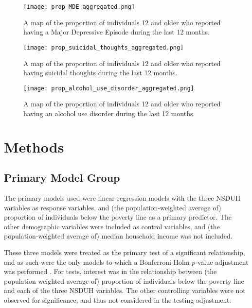 \documentclass{article}
\begin{document}
\begin{figure}[!htb]
    \centering
    \texttt{[image: prop\_MDE\_aggregated.png]}
    \caption{A map of the proportion of individuals 12 and older who
	reported having a Major Depressive Episode during the last 12 months.}
    \label{fig:map-MDE}
\end{figure}

\begin{figure}[!htb]
    \centering
    \texttt{[image: prop\_suicidal\_thoughts\_aggregated.png]}
    \caption{A map of the proportion of individuals 12 and older who
	reported having suicidal thoughts during the last 12 months.}
    \label{fig:map-suicidal-thoughts}
\end{figure}

\begin{figure}[!htb]
    \centering
    \texttt{[image: prop\_alcohol\_use\_disorder\_aggregated.png]}
    \caption{A map of the proportion of individuals 12 and older who
	reported having an alcohol use disorder during the last 12 months.}
    \label{fig:map-alcohol-use}
\end{figure}


\section{Methods}

\subsection{Primary Model Group}

The primary models used were linear regression models with the three NSDUH
variables as response variables, and
(the population-weighted average of)
proportion of individuals below the poverty line as a primary predictor.
The other demographic variables were included as control variables,
and
(the population-weighted average of)
median household income was not included.

These three models were treated as the primary test
of a significant relationship,
and as such were the only models to which a Bonferroni-Holm
$p$-value adjustment was performed \cite{holm}.
For tests, interest was in the relationship between
(the population-weighted average of)
proportion of individuals below the poverty line
and each of the three NSDUH variables.
The other controlling variables were not
observed for significance,
and thus not considered in the testing adjustment.
\end{document}
